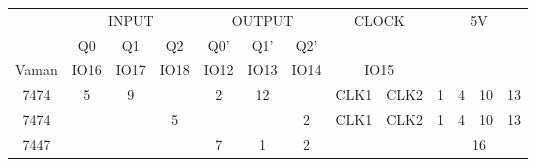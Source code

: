 \begin{tabular}{|c|c|c|c|c|c|c|c|c|c|c|c|c|}      
\hline                              
\multirow{2}{*}{} & \multicolumn{3}{|c|}{INPUT} & \multicolumn{3}{|c|}{OUTPUT} & \multicolumn{2}{|c|}{\multirow{2}{*}{CLOCK}} & \multicolumn{4}{|c|}{\multirow{3}{*}{5V}} \\      
\cline{2-7}     
& Q0 & Q1 & Q2 & Q0' & Q1' & Q2' & \multicolumn{2}{|c|}{\multirow{2}{*}{}} & \multicolumn{4}{|c|}{} \\        
\hline          
Vaman & IO16 & IO17 & IO18 & IO12 & IO13 & IO14 & \multicolumn{2}{|c|}{IO15} & \multicolumn{4}{|c|}{\multirow{3}{*}{}}\\                                   
\hline                             
7474 & 5 & 9 &  & 2 & 12 &  & CLK1 & CLK2 & 1 & 4 & 10 & 13 \\                   
\hline                     
7474 & & & 5 & & & 2 & CLK1 & CLK2 & 1 & 4  & 10 & 13 \\                       
\hline                         
7447 & \multicolumn{3}{|c|}{} & 7 & 1 & 2 & & & \multicolumn{4}{|c|}{16} \\              
\hline
\end{tabular}
